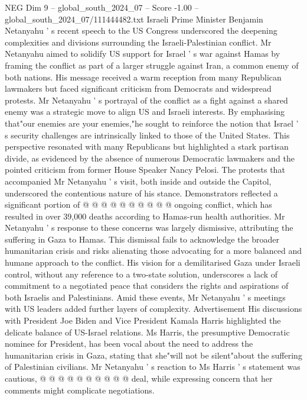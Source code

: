 \begin{textsample}{NEG Dim 9 – global\_south\_2024\_07 – Score -1.00 – global\_south\_2024\_07/111444482.txt}  \label{ex:f9_neg_352}
Israeli Prime Minister Benjamin Netanyahu ' s recent speech to the US Congress underscored the deepening complexities and divisions surrounding the Israeli-Palestinian conflict.
Mr Netanyahu aimed to solidify US support for Israel ' s war against Hamas by framing the conflict as part of a larger struggle against Iran, a common enemy of both nations.
His message received a warm reception from many Republican lawmakers but faced significant criticism from Democrats and widespread protests.
Mr Netanyahu ' s portrayal of the conflict as a fight against a shared enemy was a strategic move to align US and Israeli interests.
By emphasising that"our enemies are your enemies,"he sought to reinforce the notion that Israel ' s security challenges are intrinsically linked to those of the United States.
This perspective resonated with many Republicans but highlighted a stark partisan divide, as evidenced by the absence of numerous Democratic lawmakers and the pointed criticism from former House Speaker Nancy Pelosi.
The protests that accompanied Mr Netanyahu ' s visit, both inside and outside the Capitol, underscored the contentious nature of his stance.
Demonstrators reflected a significant portion of @ @ @ @ @ @ @ @ @ @ ongoing conflict, which has resulted in over 39,000 deaths according to Hamas-run health authorities.
Mr Netanyahu ' s response to these concerns was largely dismissive, attributing the suffering in Gaza to Hamas.
This dismissal fails to acknowledge the broader humanitarian crisis and risks alienating those advocating for a more balanced and humane approach to the conflict.
His vision for a demilitarised Gaza under Israeli control, without any reference to a two-state solution, underscores a lack of commitment to a negotiated peace that considers the rights and aspirations of both Israelis and Palestinians.
Amid these events, Mr Netanyahu ' s meetings with US leaders added further layers of complexity.
Advertisement His discussions with President Joe Biden and Vice President Kamala Harris highlighted the delicate balance of US-Israel relations.
Ms Harris, the presumptive Democratic nominee for President, has been vocal about the need to address the humanitarian crisis in Gaza, stating that she"will not be silent"about the suffering of Palestinian civilians.
Mr Netanyahu ' s reaction to Ms Harris ' s statement was cautious, @ @ @ @ @ @ @ @ @ @ deal, while expressing concern that her comments might complicate negotiations.

\end{textsample}
